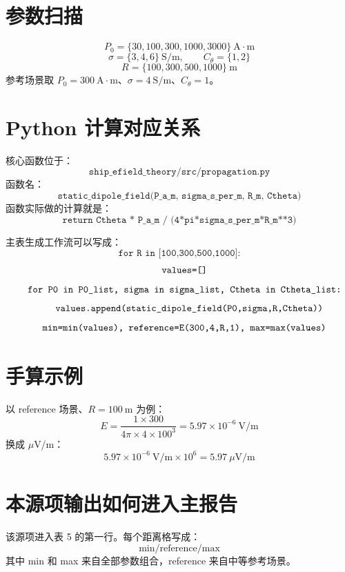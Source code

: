 \documentclass[UTF8,a4paper,11pt]{ctexart}
\begin{document}
\section{参数扫描}
\[
P_0=\{30,100,300,1000,3000\}\ \mathrm{A\cdot m}
\]
\[
\sigma=\{3,4,6\}\ \mathrm{S/m},\qquad C_\theta=\{1,2\}
\]
\[
R=\{100,300,500,1000\}\ \mathrm{m}
\]
参考场景取 $P_0=300\ \mathrm{A\cdot m}$、$\sigma=4\ \mathrm{S/m}$、$C_\theta=1$。

\section{Python 计算对应关系}
核心函数位于：
\[
\texttt{ship\_efield\_theory/src/propagation.py}
\]
函数名：
\[
\texttt{static\_dipole\_field(P\_a\_m, sigma\_s\_per\_m, R\_m, Ctheta)}
\]
函数实际做的计算就是：
\[
\texttt{return Ctheta * P\_a\_m / (4*pi*sigma\_s\_per\_m*R\_m**3)}
\]

主表生成工作流可以写成：
\[
\texttt{for R in [100,300,500,1000]:}
\]
\[
\texttt{\quad values=[]}
\]
\[
\texttt{\quad for P0 in P0\_list, sigma in sigma\_list, Ctheta in Ctheta\_list:}
\]
\[
\texttt{\quad\quad values.append(static\_dipole\_field(P0,sigma,R,Ctheta))}
\]
\[
\texttt{\quad min=min(values),\ reference=E(300,4,R,1),\ max=max(values)}
\]

\section{手算示例}
以 reference 场景、$R=100\ \mathrm{m}$ 为例：
\[
E=\frac{1\times300}{4\pi\times4\times100^3}
=5.97\times10^{-6}\ \mathrm{V/m}
\]
换成 $\mu$V/m：
\[
5.97\times10^{-6}\ \mathrm{V/m}\times10^6=5.97\ \mu\mathrm{V/m}
\]

\section{本源项输出如何进入主报告}
该源项进入表 5 的第一行。每个距离格写成：
\[
\mathrm{min/reference/max}
\]
其中 min 和 max 来自全部参数组合，reference 来自中等参考场景。
\end{document}
